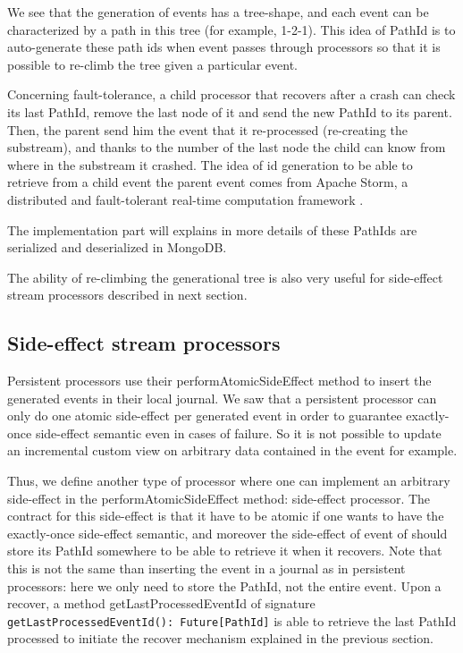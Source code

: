 We see that the generation of events has a tree-shape, and each event can be characterized by a path in this tree (for example, 1-2-1). This idea of PathId is to
auto-generate these path ids when event passes through processors so that it is possible to re-climb the tree given a particular event.

Concerning fault-tolerance, a child processor that recovers after a crash can check its last PathId, remove the last node of it and send the new PathId to its parent. Then, the parent send him the event that it re-processed (re-creating the substream), and thanks to the number of the last node the child can know from where in the substream it crashed. The idea of id generation to be able to retrieve from a child event the parent event comes from Apache Storm, a distributed and fault-tolerant real-time computation framework .

The implementation part will explains in more details of these PathIds are serialized and deserialized in MongoDB.

The ability of re-climbing the generational tree is also very useful for side-effect stream processors described in next section.

\subsection{Side-effect stream processors}
\label{sec:sideeffectproc}

Persistent processors use their performAtomicSideEffect method to insert the generated events in their local journal. We saw that a persistent processor can only do one
atomic side-effect per generated event in order to guarantee exactly-once side-effect semantic even in cases of failure. So it is not possible to update
an incremental custom view on arbitrary data contained in the event for example.

Thus, we define another type of processor where one can implement an arbitrary side-effect in the performAtomicSideEffect method: side-effect processor. The contract
for this side-effect is that it have to be atomic if one wants to have the exactly-once side-effect semantic, and moreover the side-effect of event of should store
its PathId somewhere to be able to retrieve it when it recovers. Note that this is not the same than inserting the event in a journal as in persistent processors:
here we only need to store the PathId, not the entire event. Upon a recover, a method getLastProcessedEventId of signature 
\verb|getLastProcessedEventId(): Future[PathId]| is able to retrieve the last PathId processed to initiate the recover mechanism explained in the previous section.
\\

